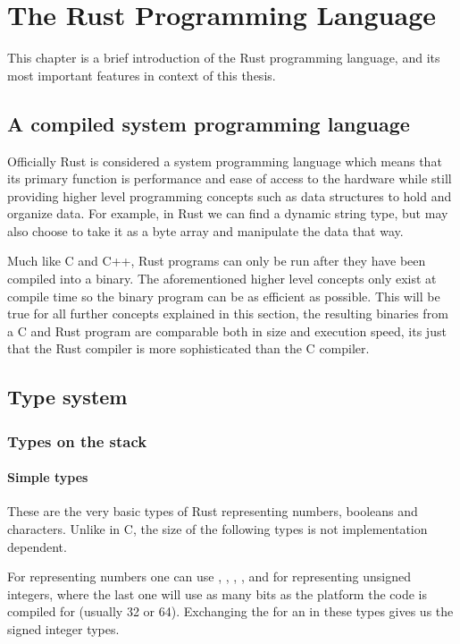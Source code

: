 \chapter{The Rust Programming Language}

This chapter is a brief introduction of the Rust programming language, and its most important features in context of this thesis.

\section{A compiled system programming language}

Officially Rust is considered a system programming language which means that its primary function is performance and ease of access to the hardware while still providing higher level programming concepts such as data structures to hold and organize data. \cite{SystemProgrammingLanguageWikipedia} For example, in Rust we can find a dynamic string type, but may also choose to take it as a byte array and manipulate the data that way.

Much like C and C++, Rust programs can only be run after they have been compiled into a binary. The aforementioned higher level concepts only exist at compile time so the binary program can be as efficient as possible. This will be true for all further concepts explained in this section, the resulting binaries from a C and Rust program are comparable both in size and execution speed, its just that the Rust compiler is more sophisticated than the C compiler.

\section{Type system}

\subsection{Types on the stack}

\subsubsection{Simple types}

These are the very basic types of Rust representing numbers, booleans and characters. Unlike in C, the size of the following types is not implementation dependent.

For representing numbers one can use , , , ,  and  for representing unsigned integers, where the last one will use as many bits as the platform the code is compiled for (usually 32 or 64). Exchanging the  for an  in these types gives us the signed integer types.

